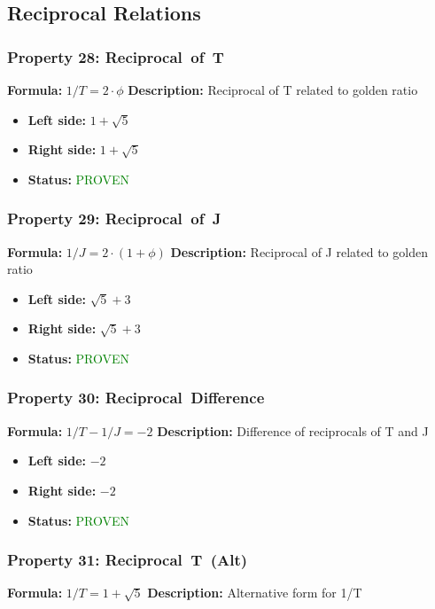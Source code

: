 \subsection{Reciprocal Relations}

\subsubsection*{Property 28: Reciprocal~of~T}
\textbf{Formula:} $1/T = 2 \cdot \phi$
\textbf{Description:} Reciprocal of T related to golden ratio

\begin{itemize}
\item \textbf{Left side:} $1 + \sqrt{5}$
\item \textbf{Right side:} $1 + \sqrt{5}$
\item \textbf{Status:} \textcolor{green}{PROVEN}
\end{itemize}

\subsubsection*{Property 29: Reciprocal~of~J}
\textbf{Formula:} $1/J = 2 \cdot (1+\phi)$
\textbf{Description:} Reciprocal of J related to golden ratio

\begin{itemize}
\item \textbf{Left side:} $\sqrt{5} + 3$
\item \textbf{Right side:} $\sqrt{5} + 3$
\item \textbf{Status:} \textcolor{green}{PROVEN}
\end{itemize}

\subsubsection*{Property 30: Reciprocal~Difference}
\textbf{Formula:} $1/T - 1/J = -2$
\textbf{Description:} Difference of reciprocals of T and J

\begin{itemize}
\item \textbf{Left side:} $-2$
\item \textbf{Right side:} $-2$
\item \textbf{Status:} \textcolor{green}{PROVEN}
\end{itemize}

\subsubsection*{Property 31: Reciprocal~T~(Alt)}
\textbf{Formula:} $1/T = 1 + \sqrt{5}$
\textbf{Description:} Alternative form for 1/T

